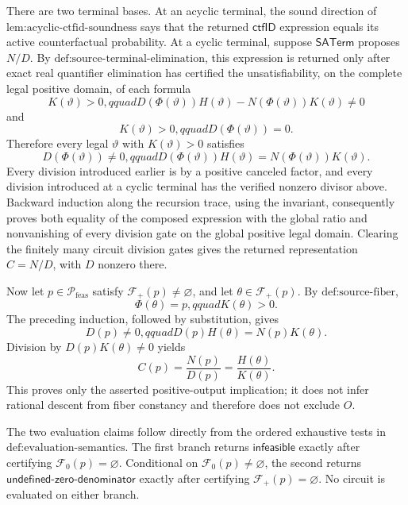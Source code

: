 There are two terminal bases.  At an acyclic terminal, the sound direction of \(\text{lem:acyclic-ctfid-soundness}\) says that the returned \(\mathsf{ctfID}\) expression equals its active counterfactual probability.  At a cyclic terminal, suppose \(\mathsf{SATerm}\) proposes \(N/D\).  By \(\text{def:source-terminal-elimination}\), this expression is returned only after exact real quantifier elimination has certified the unsatisfiability, on the complete legal positive domain, of each formula
\[
 K(\vartheta)>0,qquad
 D(\Phi(\vartheta))H(\vartheta)-N(\Phi(\vartheta))K(\vartheta)\ne0
\]
and
\[
 K(\vartheta)>0,qquad D(\Phi(\vartheta))=0.
\]
Therefore every legal \(\vartheta\) with \(K(\vartheta)>0\) satisfies
\[
 D(\Phi(\vartheta))\ne0,qquad
 D(\Phi(\vartheta))H(\vartheta)
 =N(\Phi(\vartheta))K(\vartheta).
\]
Every division introduced earlier is by a positive canceled factor, and every division introduced at a cyclic terminal has the verified nonzero divisor above.  Backward induction along the recursion trace, using the invariant, consequently proves both equality of the composed expression with the global ratio and nonvanishing of every division gate on the global positive legal domain.  Clearing the finitely many circuit division gates gives the returned representation \(C=N/D\), with \(D\) nonzero there.

Now let \(p\in\mathcal P_{\mathrm{feas}}\) satisfy \(\mathcal F_+(p)\ne\varnothing\), and let \(\theta\in\mathcal F_+(p)\).  By \(\text{def:source-fiber}\),
\[
 \Phi(\theta)=p,qquad K(\theta)>0.
\]
The preceding induction, followed by substitution, gives
\[
 D(p)\ne0,qquad
 D(p)H(\theta)=N(p)K(\theta).
\]
Division by \(D(p)K(\theta)\ne0\) yields
\[
 C(p)=\frac{N(p)}{D(p)}=\frac{H(\theta)}{K(\theta)}.
\]
This proves only the asserted positive-output implication; it does not infer rational descent from fiber constancy and therefore does not exclude \(O\).

The two evaluation claims follow directly from the ordered exhaustive tests in \(\text{def:evaluation-semantics}\).  The first branch returns \(\mathsf{infeasible}\) exactly after certifying \(\mathcal F_0(p)=\varnothing\).  Conditional on \(\mathcal F_0(p)\ne\varnothing\), the second returns \(\mathsf{undefined\mbox{-}zero\mbox{-}denominator}\) exactly after certifying \(\mathcal F_+(p)=\varnothing\).  No circuit is evaluated on either branch.


